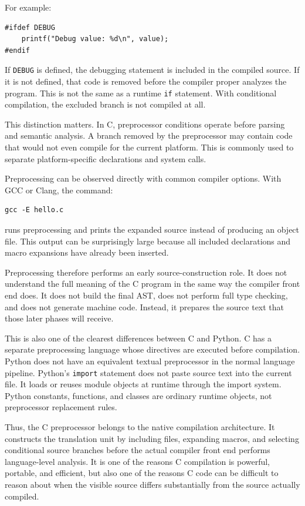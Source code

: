 For example:

\begin{verbatim}
#ifdef DEBUG
    printf("Debug value: %d\n", value);
#endif
\end{verbatim}

If \texttt{DEBUG} is defined, the debugging statement is included in the compiled source. If it is not defined, that code is removed before the compiler proper analyzes the program. This is not the same as a runtime \texttt{if} statement. With conditional compilation, the excluded branch is not compiled at all.

This distinction matters. In C, preprocessor conditions operate before parsing and semantic analysis. A branch removed by the preprocessor may contain code that would not even compile for the current platform. This is commonly used to separate platform-specific declarations and system calls.

Preprocessing can be observed directly with common compiler options. With GCC or Clang, the command:

\begin{verbatim}
gcc -E hello.c
\end{verbatim}

runs preprocessing and prints the expanded source instead of producing an object file. This output can be surprisingly large because all included declarations and macro expansions have already been inserted.

Preprocessing therefore performs an early source-construction role. It does not understand the full meaning of the C program in the same way the compiler front end does. It does not build the final AST, does not perform full type checking, and does not generate machine code. Instead, it prepares the source text that those later phases will receive.

This is also one of the clearest differences between C and Python. C has a separate preprocessing language whose directives are executed before compilation. Python does not have an equivalent textual preprocessor in the normal language pipeline. Python's \texttt{import} statement does not paste source text into the current file. It loads or reuses module objects at runtime through the import system. Python constants, functions, and classes are ordinary runtime objects, not preprocessor replacement rules.

Thus, the C preprocessor belongs to the native compilation architecture. It constructs the translation unit by including files, expanding macros, and selecting conditional source branches before the actual compiler front end performs language-level analysis. It is one of the reasons C compilation is powerful, portable, and efficient, but also one of the reasons C code can be difficult to reason about when the visible source differs substantially from the source actually compiled.


